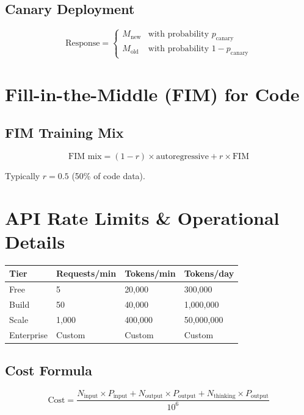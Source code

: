 \documentclass[11pt,a4paper]{article}
\begin{document}
\subsection{Canary Deployment}

$$\text{Response} = \begin{cases} M_{\text{new}} & \text{with probability } p_{\text{canary}} \\ M_{\text{old}} & \text{with probability } 1 - p_{\text{canary}} \end{cases}$$

\section{Fill-in-the-Middle (FIM) for Code}

\subsection{FIM Training Mix}

$$\text{FIM mix} = (1 - r) \times \text{autoregressive} + r \times \text{FIM}$$

Typically $r = 0.5$ (50\% of code data).

\section{API Rate Limits \& Operational Details}

\begin{center}
\begin{tabular}{llll}
\toprule
\textbf{Tier} & \textbf{Requests/min} & \textbf{Tokens/min} & \textbf{Tokens/day} \\
\midrule
Free & 5 & 20,000 & 300,000 \\
Build & 50 & 40,000 & 1,000,000 \\
Scale & 1,000 & 400,000 & 50,000,000 \\
Enterprise & Custom & Custom & Custom \\
\bottomrule
\end{tabular}
\end{center}

\subsection{Cost Formula}

$$\text{Cost} = \frac{N_{\text{input}} \times P_{\text{input}} + N_{\text{output}} \times P_{\text{output}} + N_{\text{thinking}} \times P_{\text{output}}}{10^6}$$
\end{document}

